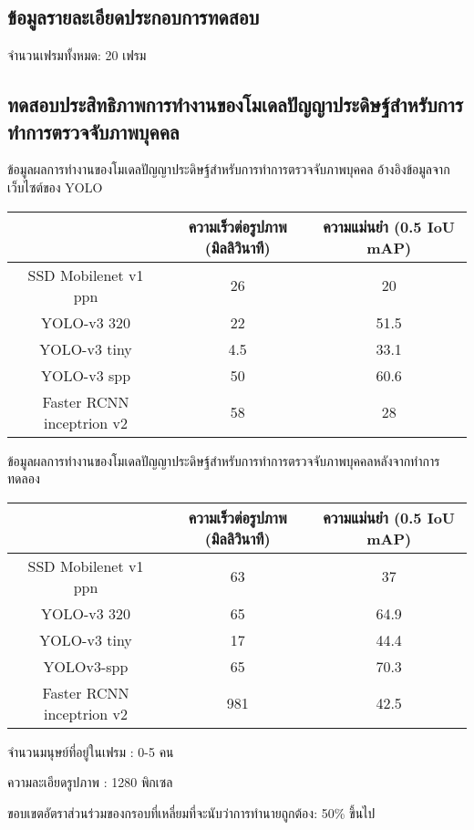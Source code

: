 \subsection{ข้อมูลรายละเอียดประกอบการทดสอบ}
จำนวนเฟรมทั้งหมด: 20 เฟรม

\subsection{ทดสอบประสิทธิภาพการทำงานของโมเดลปัญญาประดิษฐ์สำหรับการทำการตรวจจับภาพบุคคล}
ข้อมูลผลการทำงานของโมเดลปัญญาประดิษฐ์สำหรับการทำการตรวจจับภาพบุคคล อ้างอิงข้อมูลจากเว็บไซต์ของ YOLO
\begin{table}[!ht]
	\begin{tabular}{|c|c|c|}
		\hline
		{}&{ความเร็วต่อรูปภาพ (มิลลิวินาที)}&{ความแม่นยำ (0.5 IoU mAP)}			\\
		\hline
		SSD Mobilenet v1 ppn	 		& 26				& 20														\\
		YOLO-v3 320				& 22				& 51.5				\\	
		YOLO-v3 tiny				& 4.5				& 33.1				\\
		YOLO-v3 spp				& 50				& 60.6				\\	
		Faster RCNN inceptrion v2		& 58				& 28		\\
	\hline
	\end{tabular}
\end{table}

ข้อมูลผลการทำงานของโมเดลปัญญาประดิษฐ์สำหรับการทำการตรวจจับภาพบุคคลหลังจากทำการทดลอง
\begin{table}[!ht]
	\begin{tabular}{|c|c|c|}
		\hline 
		{}&{ความเร็วต่อรูปภาพ (มิลลิวินาที)}&{ความแม่นยำ (0.5 IoU mAP)}			\\
		\hline
		SSD Mobilenet v1 ppn	 					& 63 			& 37			\\
		YOLO-v3 320							& 65			& 64.9		\\
		YOLO-v3 tiny							& 17			& 44.4			\\
		YOLOv3-spp							& 65			& 70.3			\\	
		Faster RCNN inceptrion v2					& 981		& 42.5		\\
		\hline
	\end{tabular}
\end{table}
จำนวนมนุษย์ที่อยู่ในเฟรม : 0-5 คน

ความละเอียดรูปภาพ : 1280   พิกเซล

ขอบเขตอัตราส่วนร่วมของกรอบที่เหลี่ยมที่จะนับว่าการทำนายถูกต้อง: 50\% ขึ้นไป

